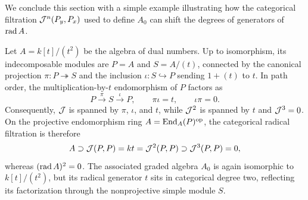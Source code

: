 We conclude this section with a simple example illustrating how the
categorical filtration $\mathcal J^n(P_y,P_x)$ used to define $A_0$ can shift the
degrees of generators of $\operatorname{rad} A$.

\begin{example}
\label{ex:dual-number-filtration}
Let $A=k[t]/(t^2)$ be the algebra of dual numbers. Up to isomorphism, its
indecomposable modules are $P=A$ and $S=A/(t)$, connected by the canonical
projection $\pi:P\twoheadrightarrow S$ and the inclusion $\iota:S\hookrightarrow P$
sending $1+(t)$ to $t$. In path order, the multiplication-by-$t$
endomorphism of $P$ factors as
\[
 P\xrightarrow{\pi}S\xrightarrow{\iota}P,
 \qquad \pi\iota=t,\qquad \iota\pi=0.
\]
Consequently, $\mathcal J$ is spanned by $\pi$, $\iota$, and $t$, while $\mathcal J^2$ is
spanned by $t$ and $\mathcal J^3=0$. On the projective endomorphism ring $A=\operatorname{End}_A(P)^{\mathrm{op}}$,
the categorical radical filtration is therefore
\[
 A\supset \mathcal J(P,P)=kt=\mathcal J^2(P,P)\supset \mathcal J^3(P,P)=0,
\]
whereas $(\operatorname{rad} A)^2=0$. The associated graded algebra $A_0$ is again
isomorphic to $k[t]/(t^2)$, but its radical generator $t$ sits in
categorical degree two, reflecting its factorization through the
nonprojective simple module $S$.
\end{example}
